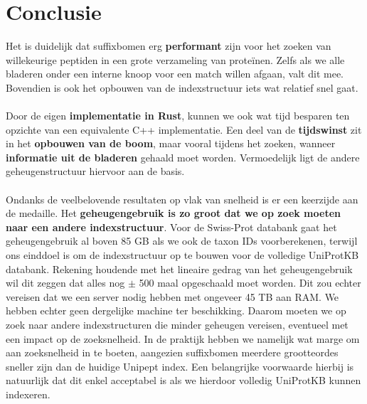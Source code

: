 \section{Conclusie}\label{sec:conclusie-suffix-bomen}
Het is duidelijk dat suffixbomen erg \textbf{performant} zijn voor het zoeken van willekeurige peptiden in een grote verzameling van proteïnen.
Zelfs als we alle bladeren onder een interne knoop voor een match willen afgaan, valt dit mee.
Bovendien is ook het opbouwen van de indexstructuur iets wat relatief snel gaat.
\\ \\
Door de eigen \textbf{implementatie in Rust}, kunnen we ook wat tijd besparen ten opzichte van een equivalente C++ implementatie.
Een deel van de \textbf{tijdswinst} zit in het\textbf{ opbouwen van de boom}, maar vooral tijdens het zoeken, wanneer \textbf{informatie uit de bladeren} gehaald moet worden.
Vermoedelijk ligt de andere geheugenstructuur hiervoor aan de basis.
\\ \\
Ondanks de veelbelovende resultaten op vlak van snelheid is er een keerzijde aan de medaille.
Het \textbf{geheugengebruik is zo groot dat we op zoek moeten naar een andere indexstructuur}.
Voor de Swiss-Prot databank gaat het geheugengebruik al boven 85 GB als we ook de taxon IDs voorberekenen, terwijl ons einddoel is om de indexstructuur op te bouwen voor de volledige UniProtKB databank.
Rekening houdende met het lineaire gedrag van het geheugengebruik wil dit zeggen dat alles nog $\pm$ 500 maal opgeschaald moet worden.
Dit zou echter vereisen dat we een server nodig hebben met ongeveer 45 TB aan RAM\@.
We hebben echter geen dergelijke machine ter beschikking.
Daarom moeten we op zoek naar andere indexstructuren die minder geheugen vereisen, eventueel met een impact op de zoeksnelheid.
In de praktijk hebben we namelijk wat marge om aan zoeksnelheid in te boeten, aangezien suffixbomen meerdere grootteordes sneller zijn dan de huidige Unipept index.
Een belangrijke voorwaarde hierbij is natuurlijk dat dit enkel acceptabel is als we hierdoor volledig UniProtKB kunnen indexeren.
